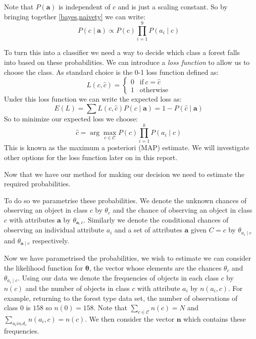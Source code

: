 Note that $P(\mathbf{a})$ is independent of $c$ and is just a scaling constant.
So by bringing together \cref{bayes,naivety} we can write:
\begin{equation}
	P(c \mid \mathbf{a}) \propto P(c)\prod_{i=1}^{9}P(a_i \mid c)
\end{equation}

To turn this into a classifier we need a way to decide which class a forest falls into based on these probabilities.
We can introduce a \textit{loss function} to allow us to choose the class.
As standard choice is the 0-1 loss function defined as:
\begin{equation}\label{0-1_loss_function}
	L(c, \hat{c}) = 
	\begin{cases}
		0 & \text{if}\ c = \hat{c} \\
		1 & \text{otherwise}
	\end{cases}
\end{equation}
Under this loss function we can write the expected loss as:
\begin{equation}
	E(L) = \sum L(c, \hat{c})P(c \mid \mathbf{a}) = 1 - P(\hat{c} \mid \mathbf{a})
\end{equation}
So to minimize our expected loss we choose:
\begin{equation} \label{map_estimate}
	\hat c = \arg\max_{c \in \mathcal{C}} P(c)\prod_{i=1}^{k}P(a_i \mid c)
\end{equation}
This is known as the maximum a posteriori (MAP) estimate.
We will investigate other options for the loss function later on in this report.

Now that we have our method for making our decision we need to estimate the required probabilities.

To do so we parametrise these probabilities.
We denote the unknown chances of observing an object in class $c$ by $\theta_c$ and the chance of observing an object in class $c$ with attributes $\mathbf{a}$ by $\theta_{\mathbf{a}, c}$.
Similarly we denote the conditional chances of observing an individual attribute $a_i$ and a set of attributes $\mathbf{a}$ given $C=c$ by $\theta_{a_i \mid c}$ and $\theta_{\mathbf{a} \mid c}$ respectively.

Now we have parametrised the probabilities, we wish to estimate we can consider the likelihood function for $\mathbf{\theta}$, the vector whose elements are the chances $\theta_{c}$ and $\theta_{a_i \mid c}$.
Using our data we denote the frequencies of objects in each class $c$ by $n(c)$ and the number of objects in class $c$ with attribute $a_i$ by $n(a_i, c)$.
For example, returning to the forest type data set, the number of observations of class $0$ is $158$ so $n(0) = 158$.
Note that $\sum_{c \in \mathcal{C}}n(c) = N$ and $\sum_{a_i in \mathcal{A}_i}n(a_i, c) = n(c)$.
We then consider the vector $\mathbf{n}$ which contains these frequencies.

